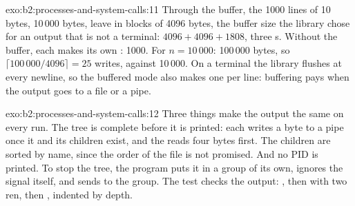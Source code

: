 \begin{solution}{exo:b2:processes-and-system-calls:11}
Through the buffer, the 1000 lines of 10 bytes, 10\,000 bytes, leave in blocks of 4096 bytes, the buffer size the
library chose for an output that is not a terminal: $4096 + 4096 + 1808$, three s. Without the buffer,
each  makes its own : 1000. For $n = 10\,000$: 100\,000 bytes, so
$\lceil 100\,000 / 4096 \rceil = 25$ writes, against 10\,000. On a terminal the library flushes at every newline, so
the buffered mode also makes one  per line: buffering pays when the output goes to a file or a pipe.
\end{solution}

\begin{solution}{exo:b2:processes-and-system-calls:12}
Three things make the output the same on every run. The tree is complete before it is printed: each  writes a
byte to a pipe once it and its children exist, and the  reads four bytes first. The children are sorted by
name, since the order of the  file is not promised. And no PID is printed. To stop the tree, the
program puts it in a  group of its own, ignores the signal itself, and sends  to the group. The
test checks the output:
, then  with two ren, then , indented by depth.
\end{solution}

